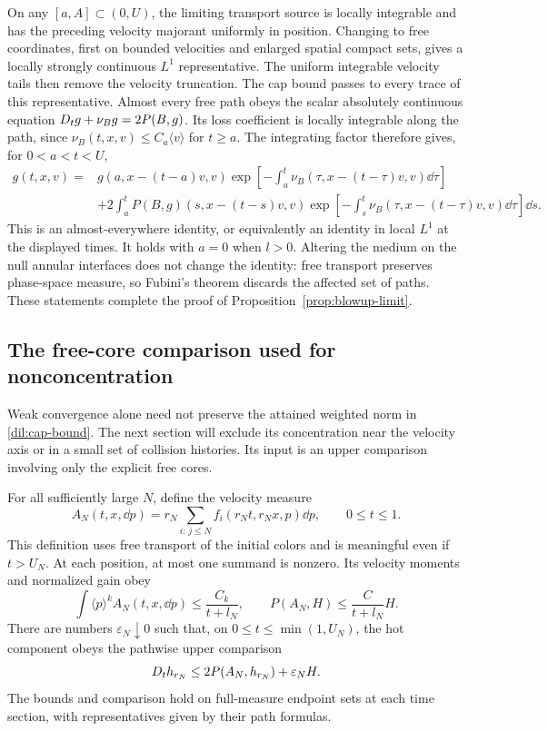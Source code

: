 On any \([a,A]\subset(0,U)\), the limiting transport source is
locally integrable and has the preceding velocity majorant uniformly
in position. Changing to free coordinates, first on bounded velocities and enlarged
spatial compact sets, gives a locally strongly continuous \(L^1\)
representative. The uniform integrable velocity tails then remove the
velocity truncation. The cap bound passes to every trace of this
representative. Almost every free path obeys the scalar absolutely
continuous equation
\(D_t g+\nu_Bg=2P(B,g)\). Its loss coefficient is locally integrable
along the path, since
\(\nu_B(t,x,v)\leq C_a\langle v\rangle\) for \(t\geq a\).
The integrating factor therefore gives, for \(0<a<t<U\),
\begin{equation}\label{dil:mild}
\begin{split}
g(t,x,v)={}&g(a,x-(t-a)v,v)
 \exp\left[-\int_a^t\nu_B(\tau,x-(t-\tau)v,v)\dd\tau\right]\\
&+2\int_a^t P(B,g)(s,x-(t-s)v,v)
 \exp\left[-\int_s^t\nu_B(\tau,x-(t-\tau)v,v)\dd\tau\right]\dd s.
\end{split}
\end{equation}
This is an almost-everywhere identity, or equivalently an identity in
local \(L^1\) at the displayed times. It holds with \(a=0\) when
\(l>0\). Altering the medium on the null annular interfaces does not
change the identity: free transport preserves phase-space measure, so
Fubini's theorem discards the affected set of paths. These statements
complete the proof of Proposition~\ref{prop:blowup-limit}.

\subsection{The free-core comparison used for nonconcentration}

Weak convergence alone need not preserve the attained weighted norm in
\eqref{dil:cap-bound}. The next section will exclude its concentration
near the velocity axis or in a small set of collision histories. Its
input is an upper comparison involving only the explicit free cores.

\begin{lemma}\label{dil:free-core-comparison}
For all sufficiently large \(N\), define the velocity measure
\[
 A_N(t,x,\dd p)
   =r_N\sum_{i:\,j\le N}f_i(r_Nt,r_Nx,p)\dd p,
       \qquad 0\le t\le1.
\]
This definition uses free transport of the initial colors and is
meaningful even if \(t>U_N\). At each position, at most one summand
is nonzero. Its velocity moments and normalized gain obey
\[
 \int\langle p\rangle^k A_N(t,x,\dd p)
      \le\frac{C_k}{t+l_N},\qquad
 P(A_N,H)\le\frac{C}{t+l_N}H.
\]
There are numbers \(\varepsilon_N\downarrow0\) such that, on
\(0\le t\le\min(1,U_N)\), the hot component obeys the pathwise
upper comparison
\begin{equation}\label{dil:positive-comparison}
 D_t h_{r_N}\le2P(A_N,h_{r_N})+\varepsilon_NH.
\end{equation}
The bounds and comparison hold on full-measure endpoint sets at each
time section, with representatives given by their path formulas.
\end{lemma}

